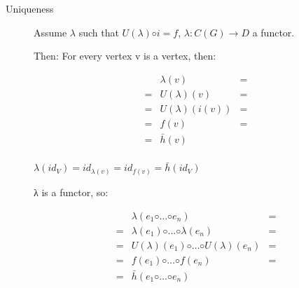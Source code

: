 \documentclass{article}
\begin{document}
\begin{enumerate}
\begin{description}
      \item[Uniqueness]

        
        Assume $λ$ such that $U(λ) ◦ i = f$, $λ  : C(G) → D$ a functor.

        Then:
        For every vertex v is a vertex, then:

        \begin{equation}
          \begin{array}{rcl}
               & λ(v)       & = \\
             = & U(λ)(v)    & = \\   %
             = & U(λ)(i(v)) & = \\ %
             = & f(v)       & = \\  %
             = & \bar{h}(v) &   \\  %
          \end{array}
        \end{equation}
               
        $λ(id_V) = id_{λ(v)} = id_{f(v)} = \bar{h}(id_V)$

        λ is a functor, so:

        \begin{equation}
          \begin{array}{rcl}
             & λ(e_1 ◦ … ◦ e_n)          & = \\
           = & λ(e_1) ◦ … ◦ λ(e_n)       & = \\  %
           = & U(λ)(e_1) ◦ … ◦ U(λ)(e_n) & = \\  %
           = & f(e_1) ◦ … ◦ f(e_n)       & = \\  %
           = & \bar{h}(e_1 ◦ … ◦ e_n)    &   \\
          \end{array}
        \end{equation}
    \end{description}

\end{enumerate}
\end{document}
